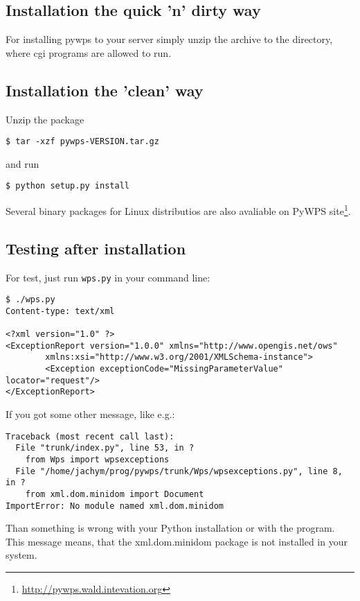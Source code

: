 \documentclass[a4paper,11pt]{article}
\newcommand{\pywpssite}{\url{http://pywps.wald.intevation.org}}
\begin{document}
\subsection{Installation the quick 'n' dirty way}
For installing pywps to your server simply unzip the archive to the
directory, where cgi programs are allowed to run. 

\subsection{Installation the 'clean' way}
Unzip the package 
\color{gray!25}
\begin{verbatim}
$ tar -xzf pywps-VERSION.tar.gz
\end{verbatim}
and run 
\begin{verbatim}
$ python setup.py install
\end{verbatim}

Several binary packages for Linux distributios are also avaliable on PyWPS
site\footnote{\pywpssite}.

\subsection{Testing after installation}
For test, just run
\texttt{wps.py} in your command line:
    
\begin{verbatim}
$ ./wps.py
Content-type: text/xml

<?xml version="1.0" ?>
<ExceptionReport version="1.0.0" xmlns="http://www.opengis.net/ows" 
        xmlns:xsi="http://www.w3.org/2001/XMLSchema-instance">
        <Exception exceptionCode="MissingParameterValue" locator="request"/>
</ExceptionReport>
    \end{verbatim}

     
If you got some other message, like e.g.:
     

    \begin{verbatim}
Traceback (most recent call last):
  File "trunk/index.py", line 53, in ?
    from Wps import wpsexceptions
  File "/home/jachym/prog/pywps/trunk/Wps/wpsexceptions.py", line 8, in ?
    from xml.dom.minidom import Document
ImportError: No module named xml.dom.minidom
    \end{verbatim}

     
Than something is wrong with your Python installation or with the program.
This message means, that the xml.dom.minidom package is not installed in
your system.
     
\end{document}
